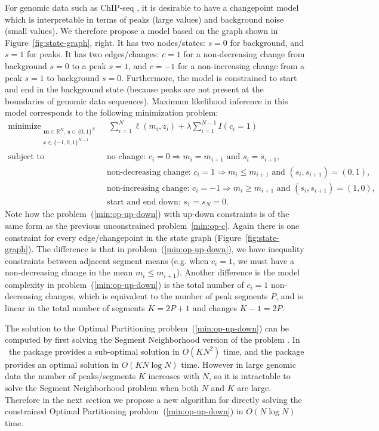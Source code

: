 \documentclass[article]{jss}
\newcommand{\R}{\proglang{R}}
\DeclareMathOperator*{\minimize}{minimize}
\newcommand{\RR}{\mathbb R}
\begin{document}
For genomic data such as ChIP-seq \citep{chip-seq}, it is desirable to
have a changepoint model which is interpretable in terms of peaks
(large values) and background noise (small values). We therefore
propose a model based on the graph shown in
Figure~\ref{fig:state-graph}, right. It has two nodes/states: $s=0$
for background, and $s=1$ for peaks. It has two edges/changes: $c=1$
for a non-decreasing change from background $s=0$ to a peak $s=1$, and
$c=-1$ for a non-increasing change from a peak $s=1$ to background
$s=0$. Furthermore, the model is constrained to start and end in the
background state (because peaks are not present at the boundaries of
genomic data sequences). Maximum likelihood inference in
this model corresponds to the following minimization problem:
\begin{align}
  \label{min:op-up-down}
  \minimize_{
  \substack{
  \mathbf m\in\RR^N,\ \mathbf s\in\{0, 1\}^N\\
  \mathbf c\in\{-1, 0,1\}^{N-1}\\
  }
  } &\ \ 
      \sum_{i=1}^N \ell(m_i, z_i) + \lambda \sum_{i=1}^{N-1} I(c_i = 1) \\
  \text{subject to\ \ } &\ \text{no change: }c_i = 0 \Rightarrow m_i = m_{i+1}\text{ and }s_i=s_{i+1}, \nonumber\\
    &\ \text{non-decreasing change: }c_i = 1 \Rightarrow m_i \leq m_{i+1}\text{ and }(s_i,s_{i+1})=(0,1),\nonumber\\
    &\ \text{non-increasing change: } c_i = -1 \Rightarrow m_i \geq m_{i+1}\text{ and }(s_i,s_{i+1})=(1,0),\nonumber\\
  & \ \text{start and end down: } s_1=s_N=0.\nonumber
\end{align}
Note how the problem~(\ref{min:op-up-down}) with up-down constraints
is of the same form as the previous unconstrained
problem~\ref{min:op-c}. Again there is one constraint for every
edge/changepoint in the state graph
(Figure~\ref{fig:state-graph}). The difference is that in
problem~(\ref{min:op-up-down}), we have inequality constraints between
adjacent segment means (e.g. when $c_i=1$, we must have a
non-decreasing change in the mean $m_i\leq m_{i+1}$). Another
difference is the model complexity in problem~(\ref{min:op-up-down})
is the total number of $c_i=1$ non-decreasing changes, which is
equivalent to the number of peak segments $P$, and is linear in the
total number of segments $K=2P+1$ and changes $K-1=2P$.


The solution to the Optimal Partitioning
problem~(\ref{min:op-up-down}) can be computed by first solving the
Segment Neighborhood version of the problem \citep{Maidstone2016}. In
\R\ the \pkg{PeakSegDP} package provides a sub-optimal solution in
$O(K N^2)$ time, and the \pkg{PeakSegOptimal} package provides an
optimal solution in $O(KN\log N)$ time. However in large genomic data
the number of peaks/segments $K$ increases with $N$, so it is
intractable to solve the Segment Neighborhood problem when both $N$
and $K$ are large. Therefore in the next section we propose a new
algorithm for directly solving the constrained Optimal Partitioning
problem~(\ref{min:op-up-down}) in $O(N\log N)$ time.
\end{document}
